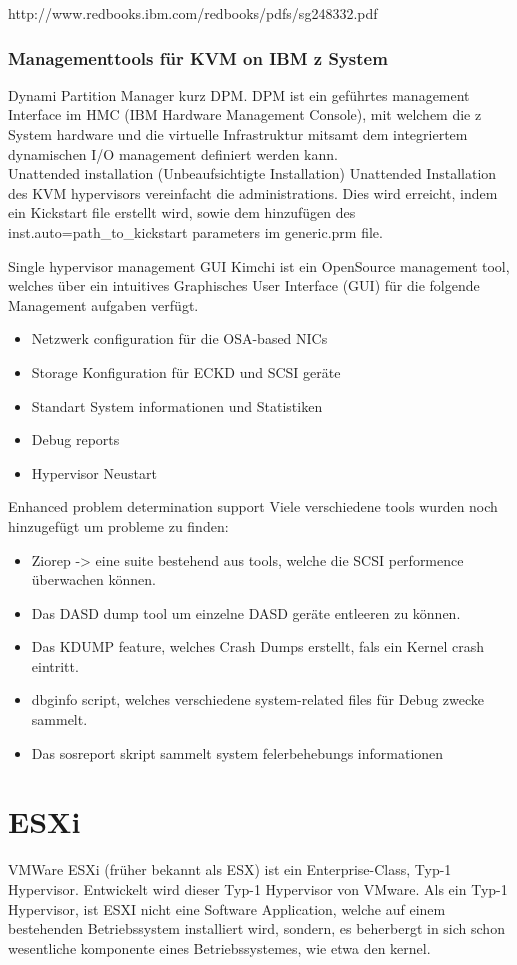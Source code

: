 \documentclass[14pt]{extreport}
\begin{document}
http://www.redbooks.ibm.com/redbooks/pdfs/sg248332.pdf


\subsubsection{Managementtools für KVM on IBM z System}
Dynami Partition Manager kurz DPM.
DPM ist ein geführtes management Interface im HMC (IBM Hardware Management Console), mit welchem die z System hardware und die virtuelle Infrastruktur mitsamt dem integriertem dynamischen I/O management  definiert werden kann.\\
Unattended installation (Unbeaufsichtigte Installation)
Unattended Installation des KVM hypervisors vereinfacht die administrations. Dies wird erreicht, indem ein Kickstart file erstellt wird, sowie dem hinzufügen des inst.auto=path\_to\_kickstart  parameters im generic.prm file.

Single hypervisor management GUI
Kimchi ist ein OpenSource management tool, welches über ein intuitives Graphisches User Interface (GUI) für die folgende Management aufgaben verfügt.
\begin{itemize}
    \item Netzwerk configuration für die OSA-based NICs
    \item Storage Konfiguration für ECKD und SCSI geräte
    \item Standart System informationen und Statistiken
    \item Debug reports
    \item Hypervisor Neustart
\end{itemize}
\newpage
Enhanced problem determination support
Viele verschiedene tools wurden noch hinzugefügt um probleme zu finden:
\begin{itemize}
    \item Ziorep -> eine suite bestehend aus tools, welche die SCSI performence überwachen können.
    \item Das DASD dump tool um einzelne DASD geräte entleeren zu können.
    \item Das KDUMP feature, welches Crash Dumps erstellt, fals ein Kernel crash eintritt.
    \item dbginfo script, welches verschiedene system-related files für Debug zwecke sammelt.
    \item Das sosreport skript sammelt system felerbehebungs informationen
\end{itemize}

\section{ESXi}
VMWare ESXi (früher bekannt als ESX) ist ein Enterprise-Class, Typ-1 Hypervisor. Entwickelt wird dieser Typ-1 Hypervisor von VMware. Als ein Typ-1 Hypervisor, ist ESXI nicht eine Software Application, welche auf einem bestehenden Betriebssystem installiert wird, sondern, es beherbergt in sich schon wesentliche komponente eines Betriebssystemes, wie etwa den kernel. \\
\end{document}
